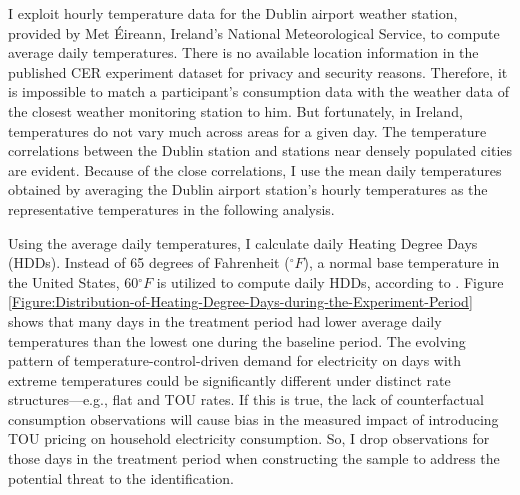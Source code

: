 I exploit hourly temperature data for the Dublin airport weather station, provided by Met \'{E}ireann, Ireland's National Meteorological Service, to compute average daily temperatures. There is no available location information in the published CER experiment dataset for privacy and security reasons. Therefore, it is impossible to match a participant's consumption data with the weather data of the closest weather monitoring station to him. But fortunately, in Ireland, temperatures do not vary much across areas for a given day. 
The temperature correlations between the Dublin station and stations near densely populated cities are evident. Because of the close correlations, I use the mean daily temperatures obtained by averaging the Dublin airport station's hourly temperatures as the representative temperatures in the following analysis. 

Using the average daily temperatures, I calculate daily Heating Degree Days (HDDs). Instead of 65 degrees of Fahrenheit ($^{\circ}F$), a normal base temperature in the United States, 60$^{\circ}F$ is utilized to compute daily HDDs, according to \cite{The-Impacts-of-Climate-Change-on-Domestic-Natural-Gas-Consumption-in-the-Greater-Dublin-Region_Liu-and-Sweeney_2012}. Figure \ref{Figure:Distribution-of-Heating-Degree-Days-during-the-Experiment-Period} shows that many days in the treatment period had lower average daily temperatures than the lowest one during the baseline period. The evolving pattern of temperature-control-driven demand for electricity on days with extreme temperatures could be significantly different under distinct rate structures---e.g., flat and TOU rates. If this is true, the lack of counterfactual consumption observations will cause bias in the measured impact of introducing TOU pricing on household electricity consumption. So, I drop observations for those days in the treatment period when constructing the sample to address the potential threat to the identification. 
